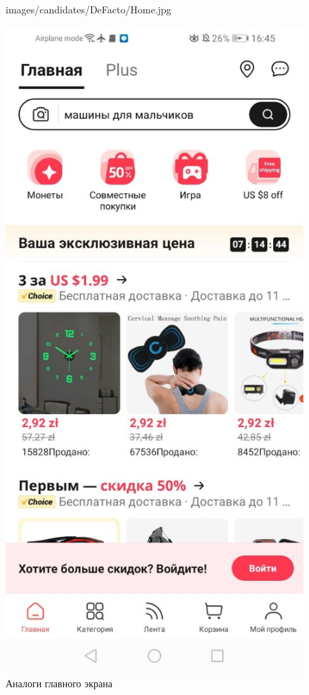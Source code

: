 \begin{figure}[!p]
\begin{minipage}{0.16\textwidth}
    {images/candidates/DeFacto/Home.jpg}
  \end{minipage}
  \begin{minipage}{0.16\textwidth}
    \includegraphics[width=.99\linewidth]
    {images/candidates/AliExpress/Home.jpg}
  \end{minipage}

  \caption{Аналоги главного экрана}\label{fig:analyzHome}
\end{figure}

